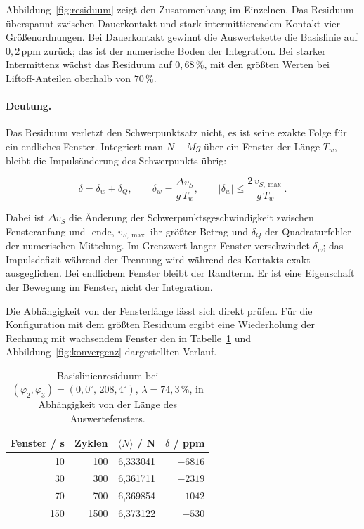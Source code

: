 \documentclass[12pt,a4paper]{report}
\begin{document}
Abbildung~\ref{fig:residuum} zeigt den Zusammenhang im Einzelnen. Das
Residuum überspannt zwischen Dauerkontakt und stark intermittierendem
Kontakt vier Größenordnungen. Bei Dauerkontakt gewinnt
die Auswertekette die Basislinie auf $0{,}2\,\mathrm{ppm}$ zurück; das
ist der numerische Boden der Integration. Bei starker Intermittenz wächst
das Residuum auf $0{,}68\,\%$, mit den größten Werten bei
Liftoff-Anteilen oberhalb von $70\,\%$.

\paragraph{Deutung.}
Das Residuum verletzt den Schwerpunktsatz nicht, es ist seine exakte
Folge für ein endliches Fenster. Integriert man $N - Mg$ über ein Fenster
der Länge $T_w$, bleibt die Impulsänderung des Schwerpunkts übrig:

\begin{equation}
  \delta = \delta_w + \delta_Q, \qquad
  \delta_w = \frac{\Delta v_S}{g\,T_w}, \qquad
  |\delta_w| \le \frac{2\,v_{S,\max}}{g\,T_w}.
  \label{eq:randterm}
\end{equation}

Dabei ist $\Delta v_S$ die Änderung der Schwerpunktsgeschwindigkeit
zwischen Fensteranfang und -ende, $v_{S,\max}$ ihr größter Betrag und
$\delta_Q$ der Quadraturfehler der numerischen Mittelung. Im Grenzwert
langer Fenster verschwindet $\delta_w$; das Impulsdefizit während der
Trennung wird während des Kontakts exakt ausgeglichen. Bei endlichem
Fenster bleibt der Randterm. Er ist eine Eigenschaft der Bewegung im
Fenster, nicht der Integration.

Die Abhängigkeit von der Fensterlänge lässt sich direkt prüfen. Für die Konfiguration mit dem größten Residuum ergibt eine
Wiederholung der Rechnung mit wachsendem Fenster den in
Tabelle~\ref{tab:konvergenz} und Abbildung~\ref{fig:konvergenz}
dargestellten Verlauf.

\begin{table}[htbp]
  \centering
  \begin{tabular}{rrrr}
    \hline
    Fenster / s & Zyklen & $\langle N \rangle$ / N & $\delta$ / ppm \\
    \hline
     10 &  100 & 6{,}333041 & $-6816$ \\
     30 &  300 & 6{,}361711 & $-2319$ \\
     70 &  700 & 6{,}369854 & $-1042$ \\
    150 & 1500 & 6{,}373122 & $-530$ \\
    \hline
  \end{tabular}
  \caption{Basislinienresiduum bei $(\varphi_2, \varphi_3) =
  (0{,}0^\circ,\, 208{,}4^\circ)$, $\lambda = 74{,}3\,\%$, in
  Abhängigkeit von der Länge des Auswertefensters.}
  \label{tab:konvergenz}
\end{table}
\end{document}
